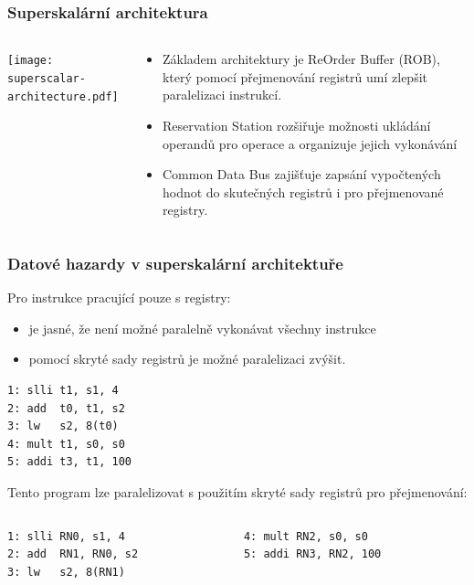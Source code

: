 \documentclass{beamer}
\begin{document}
\begin{frame}
\frametitle{Superskalární architektura}
\begin{columns}
\begin{column}{0.55\textwidth}
\texttt{[image: superscalar-architecture.pdf]}
\end{column}
\begin{column}{0.45\textwidth}
\begin{itemize}
\item Základem architektury je ReOrder Buffer (ROB), který pomocí přejmenování registrů umí zlepšit paralelizaci instrukcí.
\item Reservation Station rozšiřuje možnosti ukládání operandů pro operace a organizuje jejich vykonávání
\item Common Data Bus zajišťuje zapsání vypočtených hodnot do skutečných registrů i pro přejmenované registry.
\end{itemize}
\end{column}
\end{columns}
\end{frame}


\begin{frame}[fragile]
\frametitle{Datové hazardy v superskalární architektuře}

Pro instrukce pracující pouze s registry:
\begin{itemize}
\item je jasné, že není možné paralelně vykonávat všechny instrukce
\item pomocí skryté sady registrů je možné paralelizaci zvýšit.
\end{itemize}

\begin{verbatim}
1: slli t1, s1, 4
2: add  t0, t1, s2
3: lw   s2, 8(t0)
4: mult t1, s0, s0
5: addi t3, t1, 100
\end{verbatim}

Tento program lze paralelizovat s použitím skryté sady registrů pro přejmenování:

\begin{columns}[T]
\begin{column}{0.40\textwidth}
\begin{verbatim}
1: slli RN0, s1, 4
2: add  RN1, RN0, s2
3: lw   s2, 8(RN1)
\end{verbatim}
\end{column}
\begin{column}{0.40\textwidth}
\begin{verbatim}
4: mult RN2, s0, s0
5: addi RN3, RN2, 100
\end{verbatim}
\end{column}
\end{columns}
\end{frame}
\end{document}
